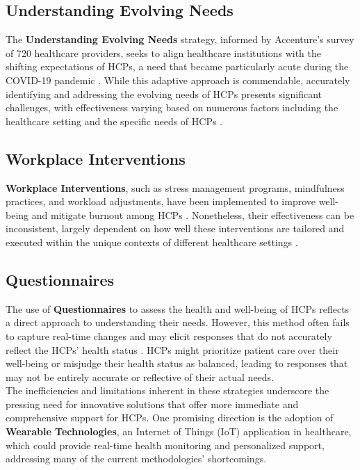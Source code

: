 \subsection{Understanding Evolving Needs}

The \textbf{Understanding Evolving Needs} strategy, informed by Accenture's survey of 720 healthcare providers, seeks to align healthcare institutions with the shifting expectations of HCPs, a need that became particularly acute during the COVID-19 pandemic \cite{ref18}. While this adaptive approach is commendable, accurately identifying and addressing the evolving needs of HCPs presents significant challenges, with effectiveness varying based on numerous factors including the healthcare setting and the specific needs of HCPs \cite{ref13,ref14}.

\subsection{Workplace Interventions}

\textbf{Workplace Interventions}, such as stress management programs, mindfulness practices, and workload adjustments, have been implemented to improve well-being and mitigate burnout among HCPs \cite{ref10}. Nonetheless, their effectiveness can be inconsistent, largely dependent on how well these interventions are tailored and executed within the unique contexts of different healthcare settings \cite{ref15}.

\subsection{Questionnaires}

The use of \textbf{Questionnaires} to assess the health and well-being of HCPs reflects a direct approach to understanding their needs. However, this method often fails to capture real-time changes and may elicit responses that do not accurately reflect the HCPs' health status \cite{ref16}. HCPs might prioritize patient care over their well-being or misjudge their health status as balanced, leading to responses that may not be entirely accurate or reflective of their actual needs. \\

\noindent The inefficiencies and limitations inherent in these strategies underscore the pressing need for innovative solutions that offer more immediate and comprehensive support for HCPs. One promising direction is the adoption of \textbf{Wearable Technologies}, an Internet of Things (IoT) application in healthcare, which could provide real-time health monitoring and personalized support, addressing many of the current methodologies' shortcomings.

